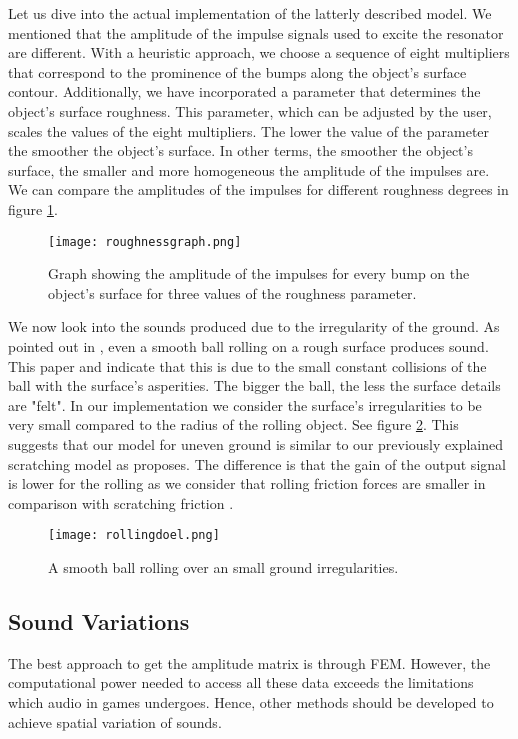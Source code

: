 Let us dive into the actual implementation of the latterly described model. We mentioned that the amplitude of the impulse signals used to excite the resonator are different. With a heuristic approach, we choose a sequence of eight multipliers that correspond to the prominence of the bumps along the object's surface contour. Additionally, we have incorporated a parameter that determines the object's surface roughness. This parameter, which can be adjusted by the user, scales the values of the eight multipliers. The lower the value of the parameter the smoother the object's surface. In other terms, the smoother the object's surface, the smaller and more homogeneous the amplitude of the impulses are. We can compare the amplitudes of the impulses for different roughness degrees in figure  \ref{fig:roughnessgraph}.

\begin{figure}[H]
  \centering
    \texttt{[image: roughnessgraph.png]}
      \caption{Graph showing the amplitude of the impulses for every bump on the object's surface for three values of the roughness parameter.}
      \label{fig:roughnessgraph}
\end{figure} 

We now look into the sounds produced due to the irregularity of the ground. As pointed out in \cite{van2001foleyautomatic}, even a smooth ball rolling on a rough surface produces sound. This paper and \cite{rath2003expressive} indicate that this is due to the small constant collisions of the ball with the surface's asperities. The bigger the ball, the less the surface details are "felt". In our implementation we consider the surface's irregularities to be very small compared to the radius of the rolling object. See figure \ref{fig:rollingdoel}. This suggests that our model for uneven ground is similar to our previously explained scratching model as \cite{van2001foleyautomatic} proposes. The difference is that the gain of the output signal is lower for the rolling as we consider that rolling friction forces are smaller in comparison with scratching friction \cite{mehtas}.

\begin{figure}[H]
  \centering
    \texttt{[image: rollingdoel.png]}
      \caption{A smooth ball rolling over an small ground irregularities.}
      \label{fig:rollingdoel}
\end{figure} 

\subsection{Sound Variations}
The best approach to get the amplitude matrix is through FEM. However, the computational power needed to access all these data exceeds the limitations which audio in games undergoes. Hence, other methods should be developed to achieve spatial variation of sounds. 

